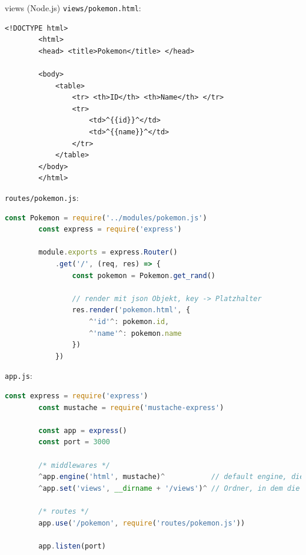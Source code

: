\begin{example}{views (Node.js)}
    \texttt{views/pokemon.html}:
    \begin{lstlisting}[language=HTML5]
        <!DOCTYPE html>
        <html>
        <head> <title>Pokemon</title> </head>

        <body>
            <table>
                <tr> <th>ID</th> <th>Name</th> </tr>
                <tr>
                    <td>^{{id}}^</td>
                    <td>^{{name}}^</td>
                </tr>
            </table>
        </body>
        </html>
    \end{lstlisting}

    \texttt{routes/pokemon.js}:
    \begin{lstlisting}[language=JavaScript]
        const Pokemon = require('../modules/pokemon.js')
        const express = require('express')
        
        module.exports = express.Router()
            .get('/', (req, res) => {
                const pokemon = Pokemon.get_rand()

                // render mit json Objekt, key -> Platzhalter
                res.render('pokemon.html', {
                    ^'id'^: pokemon.id,
                    ^'name'^: pokemon.name 
                })
            })
    \end{lstlisting}

    \texttt{app.js}:
    \begin{lstlisting}[language=JavaScript]
        const express = require('express')
        const mustache = require('mustache-express')

        const app = express()
        const port = 3000

        /* middlewares */
        ^app.engine('html', mustache)^           // default engine, die von res.render() genutzt wird
        ^app.set('views', __dirname + '/views')^ // Ordner, in dem die engine nach html Dateien sucht

        /* routes */
        app.use('/pokemon', require('routes/pokemon.js'))
        
        app.listen(port)
    \end{lstlisting}
\end{example}